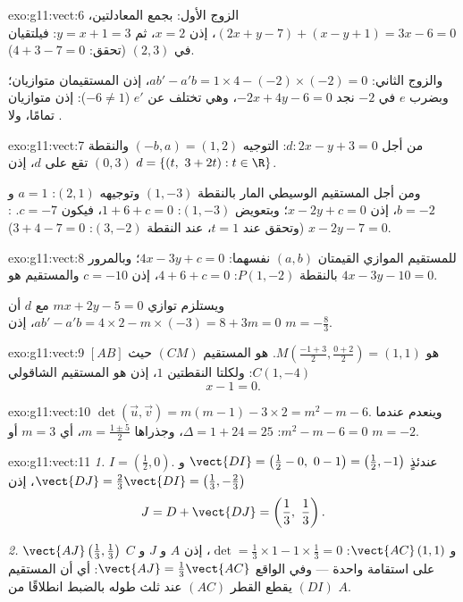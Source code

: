 \begin{solution}{exo:g11:vect:6}
الزوج الأول: بجمع المعادلتين، $(2x + y - 7) + (x - y + 1) =
3x - 6 = 0$، إذن $x = 2$، ثم $y = x + 1 = 3$: فيلتقيان في $(2, 3)$
(تحقق: $4 + 3 - 7 = 0$).

والزوج الثاني: $ab' - a'b = 1 \times 4 - (-2) \times (-2) = 0$، إذن
المستقيمان متوازيان؛ وبضرب $e$ في $-2$ نجد $-2x + 4y - 6 = 0$،
وهي تختلف عن $e'$ ($-6 \neq 1$): إذن متوازيان تمامًا، ولا
.
\end{solution}

\begin{solution}{exo:g11:vect:7}
من أجل $d: 2x - y + 3 = 0$: التوجيه $(-b, a) = (1, 2)$ والنقطة
$(0, 3)$ تقع على $d$، إذن $d = \{(t,\ 3 + 2t) : t \in \R\}$.

ومن أجل المستقيم الوسيطي المار بالنقطة $(1, -3)$ وتوجيهه $(2, 1)$:
$a = 1$ و $b = -2$، إذن $x - 2y + c = 0$؛ وبتعويض $(1, -3)$:
$1 + 6 + c = 0$، فيكون $c = -7$. : $x - 2y - 7 = 0$ (وتحقق عند $t = 1$،
عند النقطة $(3, -2)$: $3 + 4 - 7 = 0$).
\end{solution}

\begin{solution}{exo:g11:vect:8}
للمستقيم الموازي القيمتان $(a, b)$ نفسهما: $4x - 3y + c = 0$؛ وبالمرور
بالنقطة $P(1, -2)$: $4 + 6 + c = 0$، إذن $c = -10$ والمستقيم هو
$4x - 3y - 10 = 0$.

ويستلزم توازي $mx + 2y - 5 = 0$ مع $d$ أن
$ab' - a'b = 4 \times 2 - m \times (-3) = 8 + 3m = 0$، إذن
$m = -\frac83$.
\end{solution}

\begin{solution}{exo:g11:vect:9}
 $[AB]$ هو $M\!\left(\frac{-1+3}{2}, \frac{0+2}{2}\right)
= (1, 1)$.  هو المستقيم $(CM)$ حيث $C(1, -4)$: ولكلتا النقطتين
 $1$، إذن  هو المستقيم الشاقولي
\[
x - 1 = 0 .
\]
\end{solution}

\begin{solution}{exo:g11:vect:10}
$\det(\vec u, \vec v) = m(m - 1) - 3 \times 2 = m^2 - m - 6$. وينعدم
عندما $m^2 - m - 6 = 0$: $\Delta = 1 + 24 = 25$، وجذراها
$m = \frac{1 \pm 5}{2}$، أي $m = 3$ أو $m = -2$.
\end{solution}

\begin{solution}{exo:g11:vect:11}
\emph{1.} $I = \left(\frac12, 0\right)$. عندئذٍ
$\vect{DI} = \left(\frac12 - 0,\ 0 - 1\right) = \left(\frac12, -1\right)$
و $\vect{DJ} = \frac23\vect{DI} = \left(\frac13, -\frac23\right)$، إذن
\[
J = D + \vect{DJ} = \left(\frac13,\ \frac13\right).
\]

\emph{2.} $\vect{AJ}\left(\frac13, \frac13\right)$ و
$\vect{AC}\,(1, 1)$:
$\det = \frac13 \times 1 - 1 \times \frac13 = 0$، إذن $A$ و $J$ و $C$ على استقامة
واحدة --- وفي الواقع $\vect{AJ} = \frac13\vect{AC}$: أي أن المستقيم $(DI)$ يقطع
القطر $(AC)$ عند ثلث طوله بالضبط انطلاقًا من $A$.
\end{solution}


